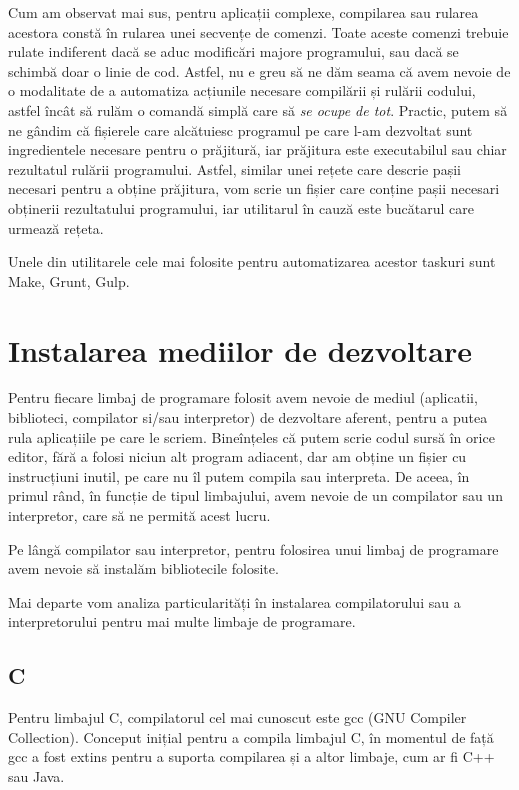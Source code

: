 Cum am observat mai sus, pentru aplicații complexe, compilarea sau rularea
acestora constă în rularea unei secvențe de comenzi. Toate aceste comenzi
trebuie rulate indiferent dacă se aduc modificări majore programului, sau dacă
se schimbă doar o linie de cod. Astfel, nu e greu să ne dăm seama că avem nevoie
de o modalitate de a automatiza acțiunile necesare compilării și rulării
codului, astfel încât să rulăm o comandă simplă care să \textit{se ocupe de
tot}. Practic, putem să ne gândim că fișierele care alcătuiesc programul pe
care l-am dezvoltat sunt ingredientele necesare pentru o prăjitură, iar
prăjitura este executabilul sau chiar rezultatul rulării programului. Astfel,
similar unei rețete care descrie pașii necesari pentru a obține prăjitura, vom
scrie un fișier care conține pașii necesari obținerii rezultatului programului,
iar utilitarul în cauză este bucătarul care urmează rețeta.

Unele din utilitarele cele mai folosite pentru automatizarea acestor taskuri
sunt Make, Grunt, Gulp.

\section{Instalarea mediilor de dezvoltare}
\label{sec:appdev-ideinstall}

Pentru fiecare limbaj de programare folosit avem nevoie de mediul (aplicatii,
biblioteci, compilator si/sau interpretor) de dezvoltare aferent, pentru a putea
rula aplicațiile pe care le scriem. Bineînțeles că putem scrie codul sursă în
orice editor, fără a folosi niciun alt program adiacent, dar am obține un fișier
cu instrucțiuni inutil, pe care nu îl putem compila sau interpreta. De aceea, în
primul rând, în funcție de tipul limbajului, avem nevoie de un compilator sau un
interpretor, care să ne permită acest lucru.

Pe lângă compilator sau interpretor, pentru folosirea unui limbaj de programare
avem nevoie să instalăm bibliotecile folosite.

Mai departe vom analiza particularități în instalarea compilatorului sau a
interpretorului pentru mai multe limbaje de programare.

\subsection{C}
\label{sec:appdev-ideinstall-c}

Pentru limbajul C, compilatorul cel mai cunoscut este gcc  (GNU Compiler Collection). Conceput inițial pentru a
compila limbajul C, în momentul de față gcc a fost extins pentru a suporta
compilarea și a altor limbaje, cum ar fi C++ sau Java.

